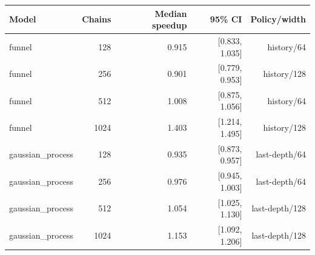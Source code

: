 \begin{tabular}{lrrrr}
\toprule
Model & Chains & Median speedup & 95\% CI & Policy/width \\
\midrule
funnel & 128 & 0.915 & [0.833, 1.035] & history/64 \\
funnel & 256 & 0.901 & [0.779, 0.953] & history/128 \\
funnel & 512 & 1.008 & [0.875, 1.056] & history/64 \\
funnel & 1024 & 1.403 & [1.214, 1.495] & history/128 \\
gaussian\_process & 128 & 0.935 & [0.873, 0.957] & last-depth/64 \\
gaussian\_process & 256 & 0.976 & [0.945, 1.003] & last-depth/64 \\
gaussian\_process & 512 & 1.054 & [1.025, 1.130] & last-depth/128 \\
gaussian\_process & 1024 & 1.153 & [1.092, 1.206] & last-depth/128 \\
\bottomrule
\end{tabular}
